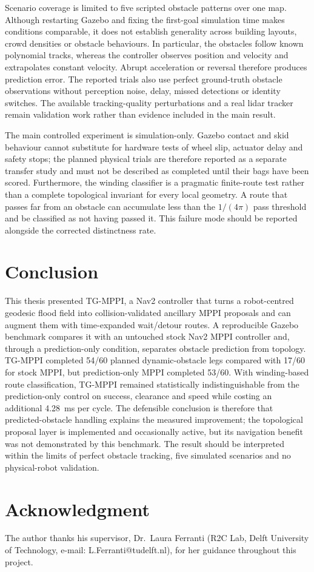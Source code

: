 \documentclass[journal]{IEEEtran}
\begin{document}
Scenario coverage is limited to five scripted obstacle patterns over one map.
Although restarting Gazebo and fixing the first-goal simulation time makes
conditions comparable, it does not establish generality across building
layouts, crowd densities or obstacle behaviours. In particular, the obstacles
follow known polynomial tracks, whereas the controller observes position and
velocity and extrapolates constant velocity. Abrupt acceleration or reversal
therefore produces prediction error. The reported trials also use perfect
ground-truth obstacle observations without perception noise, delay, missed
detections or identity switches. The available tracking-quality perturbations
and a real lidar tracker remain validation work rather than evidence included
in the main result.

The main controlled experiment is simulation-only. Gazebo contact and skid
behaviour cannot substitute for hardware tests of wheel slip, actuator delay
and safety stops; the planned physical trials are therefore reported as a
separate transfer study and must not be described as completed until their bags
have been scored.
Furthermore, the winding classifier is a pragmatic finite-route test rather
than a complete topological invariant for every local geometry. A route that
passes far from an obstacle can accumulate less than the $1/(4\pi)$ pass
threshold and be classified as not having passed it. This failure mode should
be reported alongside the corrected distinctness rate.

\section{Conclusion}
This thesis presented TG-MPPI, a Nav2 controller that turns a robot-centred
geodesic flood field into collision-validated ancillary MPPI proposals and can
augment them with time-expanded wait/detour routes. A reproducible Gazebo
benchmark compares it with an untouched stock Nav2 MPPI controller and, through
a prediction-only condition, separates obstacle prediction from topology.
TG-MPPI completed 54/60 planned dynamic-obstacle legs compared with 17/60 for
stock MPPI, but prediction-only MPPI completed 53/60. With winding-based route
classification, TG-MPPI remained statistically indistinguishable from the
prediction-only control on success, clearance and speed while costing an
additional \SI{4.28}{\milli\second} per cycle. The defensible conclusion is
therefore that predicted-obstacle handling explains the measured improvement;
the topological proposal layer is implemented and occasionally active, but its
navigation benefit was not demonstrated by this benchmark.
The result should be interpreted within the limits of perfect obstacle
tracking, five simulated scenarios and no physical-robot validation.

\section*{Acknowledgment}
The author thanks his supervisor, Dr.\ Laura Ferranti (R2C Lab, Delft
University of Technology, e-mail: L.Ferranti@tudelft.nl), for her guidance
throughout this project.



\end{document}
